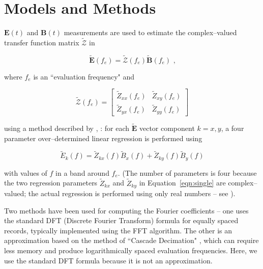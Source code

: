 \documentclass[draft,linenumbers]{agujournal2018}
\newcommand{\citeay}[1]{%
\citeauthor{#1}, \citeyear{#1}%
}
\begin{document}
\section{Models and Methods}
\label{section:Models_and_Methods}

$\mathbf{E}(t)$ and $\mathbf{B}(t)$ measurements are used to estimate the complex--valued transfer function matrix $\boldsymbol{\mathcal{\widetilde{Z}}}$ in

\begin{linenomath*}
    \begin{equation}
        \mathbf{\widetilde{E}}(f_e) = \boldsymbol{\mathcal{
    \widetilde{Z}}}(f_e)\mathbf{\widetilde{B}}(f_e)\text{ ,}
    \end{equation}
\end{linenomath*}

\noindent where $f_e$ is an ``evaluation frequency" and

\begin{linenomath*}
    \begin{equation}
        \boldsymbol{\mathcal{\widetilde{Z}}}(f_e) = 
            \begin{bmatrix}
                \widetilde{Z}_{xx}(f_e) & \widetilde{Z}_{xy}(f_e)\\
                \widetilde{Z}_{yx}(f_e) & \widetilde{Z}_{yy}(f_e)
            \end{bmatrix}
    \end{equation}
\end{linenomath*}

\noindent using a method described by \citeay{Sims1971}: for each $\mathbf{\widetilde{E}}$ vector component $k=x,y$, a four parameter over--determined linear regression is performed using

\begin{equation}
\widetilde{E}_k(f) = \widetilde{Z}_{kx}(f)\widetilde{B}_x(f) + \widetilde{Z}_{ky}(f)\widetilde{B}_y(f)
\label{eqn:single}
\end{equation}

\noindent with values of $f$ in a band around $f_e$. (The number of parameters is four because the two regression parameters $\widetilde{Z}_{kx}$ and $\widetilde{Z}_{ky}$ in Equation~\ref{eqn:single} are complex--valued; the actual regression is performed using only real numbers -- see \cite{Egbert1986}).

Two methods have been used for computing the Fourier coefficients -- one uses the standard DFT (Discrete Fourier Transform) formula for equally spaced records, typically implemented using the FFT algorithm. The other is an approximation based on the method of ``Cascade Decimation" \citep{Wight1980}, which can require less memory and produce logarithmically spaced evaluation frequencies. Here, we use the standard DFT formula because it is not an approximation.
\end{document}
